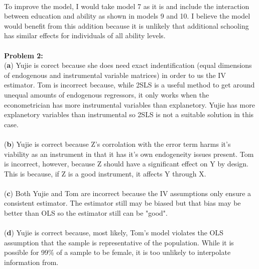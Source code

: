 \documentclass[11pt]{SelfArxOneColBMN}
\begin{document}
\\
\indent To improve the model, I would take model 7 as it is and include the interaction between education and ability as shown in models 9 and 10. I believe the model would benefit from this addition because it is unlikely that additional schooling has similar effects for individuals of all ability levels.\\
\\
\textbf{Problem 2:}\\
(\textbf{a}) Yujie is corect because she does need exact indentification (equal dimensions of endogenous and instrumental variable matrices) in order to us the IV estimator. Tom is incorrect because, while 2SLS is a useful method to get around unequal amounts of endogenous regressors, it only works when the econometrician has more instrumental variables than explanetory. Yujie has more explanetory variables than instrumental so 2SLS is not a suitable solution in this case.\\
\\
(\textbf{b}) Yujie is correct because Z's corrolation with the error term harms it's viability as an instrument in that it has it's own endogeneity issues present. Tom is incorrect, however, because Z should have a significant effect on Y by design. This is because, if Z is a good instrument, it affects Y through X.\\
\\
(\textbf{c}) Both Yujie and Tom are incorrect because the IV assumptions only ensure a consistent estimator. The estimator still may be biased but that bias may be better than OLS so the estimator still can be "good".\\
\\
(\textbf{d}) Yujie is correct because, most likely, Tom's model violates the OLS assumption that the sample is representative of the population. While it is possible for 99\% of a sample to be female, it is too unlikely to interpolate information from.
\end{document}
